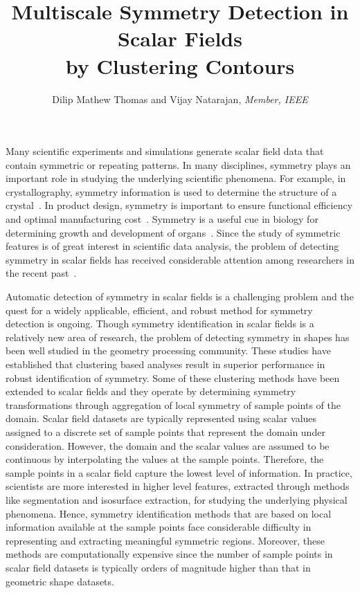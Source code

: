 \documentclass[review,journal]{vgtc}         %
\title{Multiscale Symmetry Detection in Scalar Fields\\
by Clustering Contours}
\author{Dilip Mathew Thomas and Vijay Natarajan, \textit{Member, IEEE}}
\begin{document}

\maketitle
Many scientific experiments and simulations generate scalar field data that
contain symmetric or repeating patterns. In many disciplines, 
symmetry plays an important role in studying the underlying scientific phenomena. 
For example, in crystallography, symmetry information is used to determine 
the structure of a crystal~\cite{som07}. In product design, symmetry is important 
to ensure functional efficiency and optimal manufacturing cost~\cite{booth02}. Symmetry is a 
useful cue in biology for determining growth and development of organs~\cite{stev06}. Since 
the study of symmetric features is of great interest in scientific data 
analysis, the problem of detecting symmetry in scalar fields has received 
considerable attention among researchers in the recent past~\cite{ThomN11,HongS08,kerbWKS11,ThomN13,MasoodTN13}.

Automatic detection of symmetry in scalar fields is a challenging problem and 
the quest for a widely applicable, efficient, and robust method for symmetry 
detection is ongoing. Though symmetry identification in scalar
fields is a relatively new area of research, the problem of detecting symmetry
in shapes has been well studied in the geometry processing community.
These studies have established that clustering based analyses result in superior
performance in robust identification of symmetry. Some of these clustering methods
have been extended to scalar fields and they operate by determining symmetry
transformations through aggregation of local symmetry of sample points of the
domain. Scalar field datasets are typically represented using scalar values 
assigned to a discrete set of sample points that represent the domain under 
consideration. However, the domain and the scalar values are assumed to be continuous by
interpolating the values at the sample points. Therefore, the sample points in a scalar 
field capture the lowest level of information. In practice, scientists are more interested
in higher level features, extracted through methods like segmentation and isosurface extraction,
for studying the underlying physical phenomena. Hence, symmetry identification methods that are based on 
local information available at the sample points face considerable difficulty in representing 
and extracting meaningful symmetric regions. Moreover, these methods are computationally 
expensive since the number of sample points in scalar field datasets is typically orders of magnitude
higher than that in geometric shape datasets.
\end{document}
